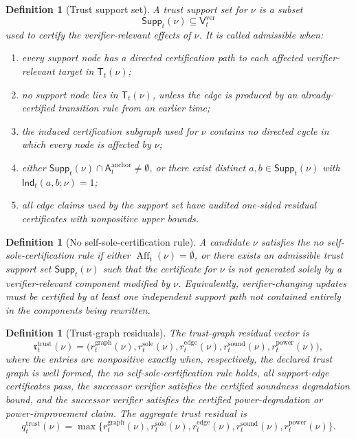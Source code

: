 \documentclass[11pt,a4paper]{article}
\newtheorem{definition}[theorem]{Definition}
\newcommand{\ver}{\mathrm{ver}}
\newcommand{\trust}{\mathrm{trust}}
\newcommand{\anchor}{\mathrm{anchor}}
\newcommand{\graph}{\mathrm{graph}}
\newcommand{\sole}{\mathrm{sole}}
\newcommand{\edge}{\mathrm{edge}}
\newcommand{\sound}{\mathrm{sound}}
\newcommand{\power}{\mathrm{power}}
\begin{document}
\begin{definition}[Trust support set]
\label{def:trust-support-set}
A trust support set for \(\nu\) is a subset
\[
\mathsf{Supp}_t(\nu)\subseteq \mathsf V_t^{\ver}
\]
used to certify the verifier-relevant effects of \(\nu\).  It is called admissible when:
\begin{enumerate}[label=(\alph*),leftmargin=1.5em]
    \item every support node has a directed certification path to each affected verifier-relevant target in \(\mathsf T_t(\nu)\);
    \item no support node lies in \(\mathsf T_t(\nu)\), unless the edge is produced by an already-certified transition rule from an earlier time;
    \item the induced certification subgraph used for \(\nu\) contains no directed cycle in which every node is affected by \(\nu\);
    \item either \(\mathsf{Supp}_t(\nu)\cap\mathsf A_t^{\anchor}\neq\emptyset\), or there exist distinct \(a,b\in\mathsf{Supp}_t(\nu)\) with \(\mathsf{Ind}_t(a,b;\nu)=1\);
    \item all edge claims used by the support set have audited one-sided residual certificates with nonpositive upper bounds.
\end{enumerate}
\end{definition}

\begin{definition}[No self-sole-certification rule]
\label{def:no-self-sole-certification}
A candidate \(\nu\) satisfies the no self-sole-certification rule if either \(\operatorname{Aff}_t(\nu)=\emptyset\), or there exists an admissible trust support set \(\mathsf{Supp}_t(\nu)\) such that the certificate for \(\nu\) is not generated solely by a verifier-relevant component modified by \(\nu\).  Equivalently, verifier-changing updates must be certified by at least one independent support path not contained entirely in the components being rewritten.
\end{definition}

\begin{definition}[Trust-graph residuals]
\label{def:trust-graph-residuals}
The trust-graph residual vector is
\[
\mathfrak r_t^{\trust}(\nu)=
\bigl(r_t^{\graph}(\nu),r_t^{\sole}(\nu),r_t^{\edge}(\nu),r_t^{\sound}(\nu),r_t^{\power}(\nu)\bigr),
\]
where the entries are nonpositive exactly when, respectively, the declared trust graph is well formed, the no self-sole-certification rule holds, all support-edge certificates pass, the successor verifier satisfies the certified soundness degradation bound, and the successor verifier satisfies the certified power-degradation or power-improvement claim.  The aggregate trust residual is
\[
q_t^{\trust}(\nu)=\max\{r_t^{\graph}(\nu),r_t^{\sole}(\nu),r_t^{\edge}(\nu),r_t^{\sound}(\nu),r_t^{\power}(\nu)\}.
\]
\end{definition}
\end{document}
